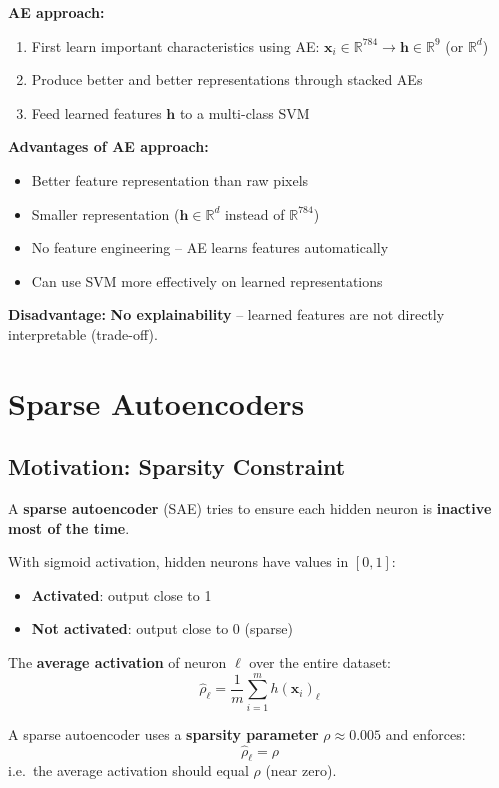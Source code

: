 \documentclass[12pt,a4paper]{article}
\newcommand{\R}{\mathbb{R}}
\newcommand{\vx}{\mathbf{x}}
\newcommand{\vh}{\mathbf{h}}
\begin{document}
\textbf{AE approach:}
\begin{enumerate}
  \item First learn important characteristics using AE: $\vx_i \in \R^{784} \to \vh \in \R^9$ (or $\R^d$)
  \item Produce better and better representations through stacked AEs
  \item Feed learned features $\vh$ to a multi-class SVM
\end{enumerate}

\textbf{Advantages of AE approach:}
\begin{itemize}
  \item Better feature representation than raw pixels
  \item Smaller representation ($\vh \in \R^d$ instead of $\R^{784}$)
  \item No feature engineering -- AE learns features automatically
  \item Can use SVM more effectively on learned representations
\end{itemize}

\textbf{Disadvantage:} \textbf{No explainability} -- learned features are not directly interpretable (trade-off).

\section{Sparse Autoencoders}

\subsection{Motivation: Sparsity Constraint}

A \textbf{sparse autoencoder} (SAE) tries to ensure each hidden neuron is \textbf{inactive most of the time}.

\begin{defbox}
With sigmoid activation, hidden neurons have values in $[0,1]$:
\begin{itemize}
  \item \textbf{Activated}: output close to 1
  \item \textbf{Not activated}: output close to 0 (sparse)
\end{itemize}

The \textbf{average activation} of neuron $\ell$ over the entire dataset:
\[
\hat{\rho}_\ell = \frac{1}{m}\sum_{i=1}^{m}h(\vx_i)_\ell
\]

A sparse autoencoder uses a \textbf{sparsity parameter} $\rho \approx 0.005$ and enforces:
\[
\boxed{\hat{\rho}_\ell = \rho}
\]
i.e.\ the average activation should equal $\rho$ (near zero).
\end{defbox}
\end{document}
